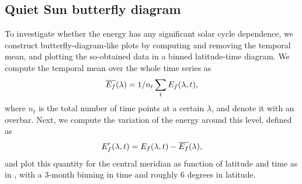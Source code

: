 \documentclass{aa}
\begin{document}


\subsection{Quiet Sun \fff butterfly diagram}\label{qsf}

To investigate whether the \fff energy has any significant solar cycle dependence, we construct butterfly-diagram-like plots by computing and removing the temporal mean, and plotting the so-obtained data in a binned latitude-time diagram. 
We compute the temporal mean over the whole time series as 
\begin{equation}
    \overline{E_f}(\lambda) = 1/n_t \sum_t E_f(\lambda,t),
\end{equation}
where $n_t$ is the total number of time points at a certain $\lambda$, and denote it with an overbar. Next, we compute the variation of the \fff energy around this level, defined as
\begin{equation}
    E_f'(\lambda,t)=E_f(\lambda,t)-\overline{E_f}(\lambda),
\end{equation}
and plot this quantity
for the central meridian
as function of latitude and time as in , with a 3-month binning in time and roughly 6 degrees in latitude. 
\end{document}
